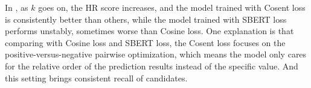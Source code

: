 In , as $k$ goes on, the HR score increases, and the model trained with Cosent loss is consistently better than others, while the model trained with SBERT loss performs unstably, sometimes worse than Cosine loss. 
One explanation is that comparing with Cosine loss and SBERT loss, the Cosent loss focuses on the positive-versus-negative pairwise optimization, which means the model only cares for the relative order of the prediction results instead of the specific value. And this setting brings consistent recall of candidates.

